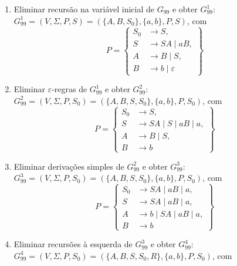\documentclass[12pt]{article}
\def\myling{{99}} %
\newcommand{\ve}{\ensuremath{\varepsilon}}
\begin{document}
\begin{tcolorbox}[breakable,rounded corners, colback=yellow!5, colframe=red!40!black, title={Transformações em $G_{\myling}$.}]
\begin{enumerate}
  \item Eliminar recursão na variável inicial de $G_{\myling}$ e obter $G_{\myling}^1$:\\
  $G_{\myling}^1=(V,\Sigma,P,S)=(\{A,B,S_0\},\{a,b\},P,S)$, com
    \[P=\left\{
     \begin{aligned}
      S_0 & \to S,\\
      S & \to SA\mid aB, \\
      A & \to B\mid S, \\
      B & \to b\mid \ve
     \end{aligned}
    \right\}\]
  \item Eliminar $\ve$-regras de $G_{\myling}^1$ e obter $G_{\myling}^2$:\\
  $G_{\myling}^2=(V,\Sigma,P,S_0)=(\{A,B,S,S_0\},\{a,b\},P,S_0)$, com
    \[P=\left\{
     \begin{aligned}
      S_0 & \to S, \\
      S   & \to SA\mid S\mid aB\mid a, \\
      A   & \to B\mid S, \\
      B   & \to b
     \end{aligned}
    \right\}\]
  \item Eliminar derivações simples de $G_{\myling}^2$ e obter $G_{\myling}^3$:\\
  $G_{\myling}^3=(V,\Sigma,P,S_0)=(\{A,B,S,S_0\},\{a,b\},P,S_0)$, com
    \[P=\left\{
     \begin{aligned}
      S_0 & \to SA\mid aB\mid a, \\
      S   & \to SA\mid aB\mid a, \\
      A   & \to b\mid SA\mid aB\mid a, \\
      B   & \to b
     \end{aligned}
    \right\}\]
  \item Eliminar recursões à esquerda de $G_{\myling}^3$ e obter $G_{\myling}^4$:\\
  $G_{\myling}^4=(V,\Sigma,P,S_0)=(\{A,B,S,S_0,R\},\{a,b\},P,S_0)$, com

\end{enumerate}
\end{tcolorbox}
\end{document}
